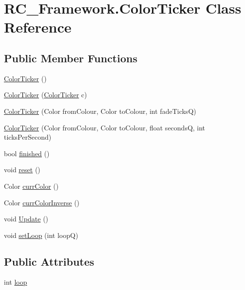 \hypertarget{class_r_c___framework_1_1_color_ticker}{}\section{R\+C\+\_\+\+Framework.\+Color\+Ticker Class Reference}
\label{class_r_c___framework_1_1_color_ticker}
\subsection*{Public Member Functions}
\begin{DoxyCompactItemize}
\item 
\mbox{\hyperlink{class_r_c___framework_1_1_color_ticker_aecd5ed1d064f9be829f2c22c1103fc50}{Color\+Ticker}} ()
\item 
\mbox{\hyperlink{class_r_c___framework_1_1_color_ticker_a0b57cdeb155de3c935b2c727dffb7189}{Color\+Ticker}} (\mbox{\hyperlink{class_r_c___framework_1_1_color_ticker}{Color\+Ticker}} c)
\item 
\mbox{\hyperlink{class_r_c___framework_1_1_color_ticker_a7c0b9b447bdcb0f010f364a211da40e6}{Color\+Ticker}} (Color from\+Colour, Color to\+Colour, int fade\+TicksQ)
\item 
\mbox{\hyperlink{class_r_c___framework_1_1_color_ticker_a22777d0f4150e9573fd912c8d82086c9}{Color\+Ticker}} (Color from\+Colour, Color to\+Colour, float secondsQ, int ticks\+Per\+Second)
\item 
bool \mbox{\hyperlink{class_r_c___framework_1_1_color_ticker_a89683c5264088a9bf6b703e8d91e186a}{finished}} ()
\item 
void \mbox{\hyperlink{class_r_c___framework_1_1_color_ticker_aae75b5bc18a6b631b53edfdc0768a2e0}{reset}} ()
\item 
Color \mbox{\hyperlink{class_r_c___framework_1_1_color_ticker_a4ff94f212ee4070547039f77031e4a93}{curr\+Color}} ()
\item 
Color \mbox{\hyperlink{class_r_c___framework_1_1_color_ticker_a60d66f719f8952f11db6fd62a5db9aec}{curr\+Color\+Inverse}} ()
\item 
void \mbox{\hyperlink{class_r_c___framework_1_1_color_ticker_afa89b9995729435eba8841d7b730fbbb}{Update}} ()
\item 
void \mbox{\hyperlink{class_r_c___framework_1_1_color_ticker_ac3a8a1305aaa6d6c514853da2437625c}{set\+Loop}} (int loopQ)
\end{DoxyCompactItemize}
\subsection*{Public Attributes}
\begin{DoxyCompactItemize}
\item 
int \mbox{\hyperlink{class_r_c___framework_1_1_color_ticker_ab06435afedff63f18d0d8c1eede81037}{loop}}
\end{DoxyCompactItemize}


